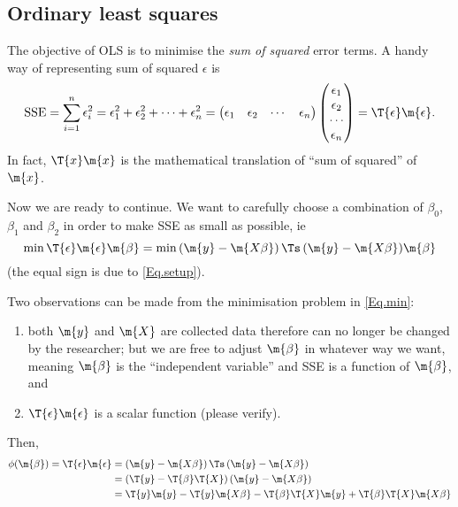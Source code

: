 \subsection{Ordinary least squares}

The objective of OLS is to minimise the \emph{sum of squared} error terms. A handy way of representing sum of squared $\epsilon$ is
\begin{equation}
  \text{SSE}=\sum_{i=1}^n\epsilon_i^2=\epsilon_1^2+\epsilon_2^2+\cdots+\epsilon_n^2=
  \begin{pmatrix}
    \epsilon_1      &\epsilon_2     &\cdots      &\epsilon_n
  \end{pmatrix}
  \begin{pmatrix}
    \epsilon_1\\
    \epsilon_2\\
    \cdots\\
    \epsilon_n
  \end{pmatrix}
  =\T{\epsilon}\m{\epsilon}.
\end{equation}
In fact, $\T{x}\m{x}$ is the mathematical translation of ``sum of squared'' of $\m{x}$.

Now we are ready to continue. We want to carefully choose a combination of $\beta_0$, $\beta_1$ and $\beta_2$ in order to make SSE as small as possible, ie
\begin{equation}\label{Eq.min}
  \min{\T{\epsilon}\m{\epsilon}}{\m{\beta}}=\min{\left(\m{y}-\m{X\beta}\right)\Ts\left(\m{y}-\m{X\beta}\right)}{\m{\beta}}
\end{equation}
(the equal sign is due to \cref{Eq.setup}).

Two observations can be made from the minimisation problem in \cref{Eq.min}:
\begin{enumerate}
  \item both $\m{y}$ and $\m{X}$ are collected data therefore can no longer be changed by the researcher; but we are free to adjust $\m{\beta}$ in whatever way we want, meaning $\m{\beta}$ is the ``independent variable'' and SSE is a function of $\m{\beta}$, and
  \item $\T{\epsilon}\m{\epsilon}$ is a scalar function (please verify).
\end{enumerate}
Then,
\begin{equation}
  \begin{aligned}
    \phi(\m{\beta})=\T{\epsilon}\m{\epsilon}&=\left(\m{y}-\m{X\beta}\right)\Ts\left(\m{y}-\m{X\beta}\right)\\
  &=\left(\T{y}-\T{\beta}\T{X}\right)\left(\m{y}-\m{X\beta}\right)\\
  &=\T{y}\m{y}-\T{y}\m{X\beta}-\T{\beta}\T{X}\m{y}+\T{\beta}\T{X}\m{X\beta}
  \end{aligned}
\end{equation}

